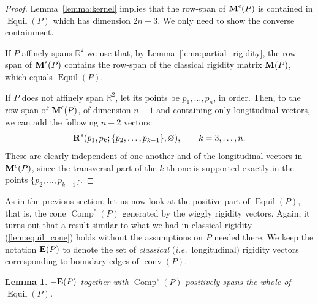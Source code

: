 \documentclass{amsart}
\newtheorem{lemma}[theorem]{Lemma}
\theoremstyle{definition}
\newcommand{\R}{\mathbb{R}} %
\renewcommand{\b}[1]{{\boldsymbol{#1}}} %
\DeclareMathOperator{\conv}{conv} %
\newcommand{\ie}{\textit{i.e.}~} %
\newcommand{\Rvector}{\b{\rm R}} %
\newcommand{\Reps}{\Rvector^\epsilon} %
\newcommand{\Mmatrix}{\b{\rm M}} %
\newcommand{\Ematrix}{\b{\rm E}} %
\newcommand{\Meps}{\Mmatrix^\epsilon} %
\newcommand{\Equil}{\operatorname{Equil} } %
\newcommand{\Comp}{\operatorname{Comp} } %
\begin{document}
\begin{proof}
Lemma~\ref{lemma:kernel} implies that the row-span of $\Meps(P)$ is contained in $\Equil(P)$ which has dimension $2n-3$.
We only need to show the converse containment. 

If $P$ affinely spans $\R^2$ we use that, by Lemma~\ref{lema:partial_rigidity}, the row span of  $\Meps(P)$ contains the row-span of the classical rigidity matrix $\Mmatrix(P)$, which equals $\Equil(P)$.

If $P$ does not affinely span $\R^2$, let its points be $p_1,\dots,p_n$, in order.
Then, to the row-span of $\Meps(P)$, of dimension $n-1$ and containing only longitudinal vectors, we can add the following $n-2$ vectors:
\[
\Reps(p_1,p_k; \{p_2,\dots,p_{k-1}\}, \varnothing), \qquad k=3,\dots, n.
\]
These are clearly independent of one another and of the longitudinal vectors in $\Meps(P)$, since the transversal part of the $k$-th one is supported exactly in the points $\{p_2,\dots, p_{k-1}\}$.
\end{proof}

As in the previous section, let us now look at the positive part of $\Equil(P)$, that is, the cone $\Comp^\epsilon(P)$ generated by the wiggly rigidity vectors. 
Again, it turns out that a  result similar to what we had in classical rigidity (\cref{lem:equil_cone}) holds without the  assumptions on $P$ needed there.
We keep the notation $\Ematrix(P)$ to denote the set of \emph{classical} (\ie longitudinal) rigidity vectors corresponding to boundary edges of $\conv(P)$.


\begin{lemma}
\label{lem:equil_cone_epsilon}
$-\Ematrix(P)$ together with $\Comp^\epsilon(P)$ positively spans the whole of $\Equil(P)$.
\end{lemma}
\end{document}
